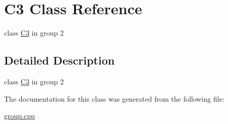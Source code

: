 \hypertarget{class_c3}{\section{C3 Class Reference}
\label{class_c3}
}


class \hyperlink{class_c3}{C3} in group 2  




\subsection{Detailed Description}
class \hyperlink{class_c3}{C3} in group 2 

The documentation for this class was generated from the following file\-:\begin{DoxyCompactItemize}
\item 
\hyperlink{group_8cpp}{group.\-cpp}\end{DoxyCompactItemize}
